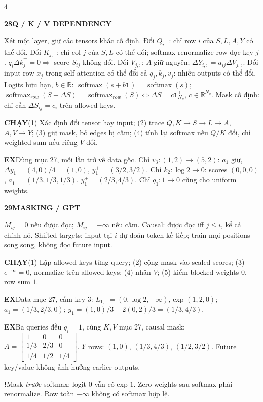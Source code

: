 \documentclass[a4paper]{article}
\newcommand{\topic}[2]{\par\addvspace{.8pt}%
  \begingroup\setlength{\fboxsep}{0.5pt}%
  \noindent\colorbox{structure}{\parbox{\dimexpr\linewidth-2\fboxsep\relax}{%
    \color{white}\fontsize{6.5}{7.1}\selectfont\bfseries #1\enspace #2}}%
  \endgroup\par\nobreak\vspace{.3pt}\nobreak}
\newcommand{\run}[1]{\key{CHẠY}#1}
\newcommand{\key}[1]{\par\textcolor{structure}{\textbf{#1}}\enspace}
\newcommand{\note}[4]{\par\begingroup\setlength{\fboxsep}{0.15pt}%
  \noindent\colorbox{#1}{\parbox{\dimexpr\linewidth-2\fboxsep\relax}{%
    \RaggedRight\textcolor{#2}{\textbf{#3}}\enspace #4}}%
  \endgroup\par}
\newcommand{\trap}[1]{\note{warningbg}{warning}{!}{#1}}
\newcommand{\ex}[1]{\note{examplebg}{example}{EX}{#1}}
\newcommand{\R}{\mathbb{R}}
\begin{document}
\begin{multicols*}{4}
\topic{28}{Q / K / V DEPENDENCY}
Xét một layer, giữ các tensors khác cố định.
Đổi $Q_{i,:}$: chỉ row $i$ của $S,L,A,Y$ có thể đổi.
Đổi $K_{j,:}$: chỉ col $j$ của $S,L$ có thể đổi; softmax renormalize row đọc key $j$. $q_i\Delta k_j^\top=0\Rightarrow$ score $S_{ij}$ không đổi.
Đổi $V_{j,:}$: $A$ giữ nguyên; $\Delta Y_{i,:}=a_{ij}\Delta V_{j,:}$.
Đổi input row $x_j$ trong self-attention có thể đổi cả $q_j,k_j,v_j$: nhiều outputs có thể đổi.
Logits hữu hạn, $b\in\R$: $\operatorname{softmax}(s+b\mathbf1)=\operatorname{softmax}(s)$;
$\operatorname{softmax}_{row}(S+\Delta S)=\operatorname{softmax}_{row}(S)\iff\Delta S=c\mathbf1_{N_k}^\top$, $c\in\R^{N_q}$.
Mask cố định: chỉ cần $\Delta S_{ij}=c_i$ trên allowed keys.
\run{(1) Xác định đổi tensor hay input; (2) trace $Q,K\to S\to L\to A$, $A,V\to Y$; (3) giữ mask, bỏ edges bị cấm; (4) tính lại softmax nếu $Q/K$ đổi, chỉ weighted sum nếu riêng $V$ đổi.}
\ex{Dùng mục 27, mỗi lần trở về data gốc. Chỉ $v_3:(1,2)\to(5,2)$: $a_1$ giữ, $\Delta y_1=(4,0)/4=(1,0)$, $y_1^+=(3/2,3/2)$. Chỉ $k_2:\log2\to0$: scores $(0,0,0)$, $a_1^+=(1/3,1/3,1/3)$, $y_1^+=(2/3,4/3)$. Chỉ $q_1:1\to0$ cũng cho uniform weights.}

\topic{29}{MASKING / GPT}
$M_{ij}=0$ nếu được đọc; $M_{ij}=-\infty$ nếu cấm.
Causal: được đọc iff $j\le i$, kể cả chính nó. Shifted targets: input tại $i$ dự đoán token kế tiếp; train mọi positions song song, không đọc future input.
\run{(1) Lập allowed keys từng query; (2) cộng mask vào scaled scores; (3) $e^{-\infty}=0$, normalize trên allowed keys; (4) nhân $V$; (5) kiểm blocked weights $0$, row sum $1$.}
\ex{Data mục 27, cấm key 3: $L_{1,:}=(0,\log2,-\infty)$, exp $(1,2,0)$; $a_1=(1/3,2/3,0)$; $y_1=(1,0)/3+2(0,2)/3=(1/3,4/3)$.}
\ex{Ba queries đều $q_i=1$, cùng $K,V$ mục 27, causal mask: $A=\left[\begin{smallmatrix}1&0&0\\1/3&2/3&0\\1/4&1/2&1/4\end{smallmatrix}\right]$. $Y$ rows: $(1,0)$, $(1/3,4/3)$, $(1/2,3/2)$. Future key/value không ảnh hưởng earlier outputs.}
\trap{Mask \emph{trước} softmax; logit $0$ vẫn có exp $1$. Zero weights sau softmax phải renormalize. Row toàn $-\infty$ không có softmax hợp lệ.}


\end{multicols*}
\end{document}
